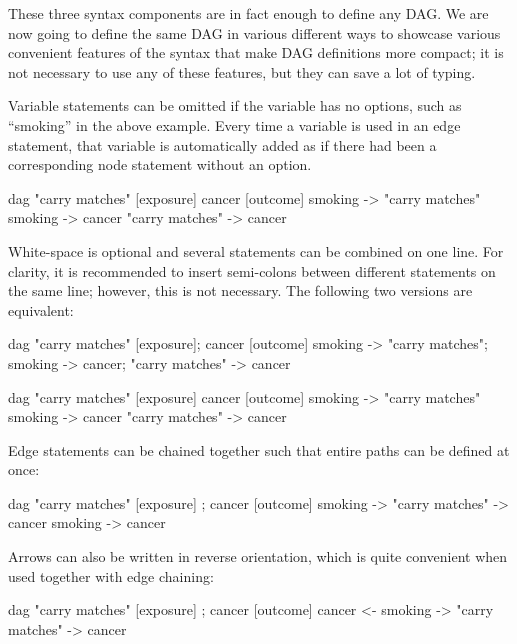 \documentclass[a4paper]{article} %
\begin{document}
These three syntax components are in fact enough to define any DAG. We are now going to define the same DAG in various different ways to showcase various convenient features of the syntax that make DAG definitions more compact; it is not necessary to use any of these features, but they can save a lot of typing.

Variable statements can be omitted if the variable has no options, such as ``smoking'' in the above example. Every time a variable is used in an edge statement, that variable is automatically added as if there had been a corresponding node statement without an option.

\begin{dagcode}
dag{ 
  "carry matches" [exposure]
  cancer [outcome]
  smoking -> "carry matches"
  smoking -> cancer
  "carry matches" -> cancer
}
\end{dagcode}


White-space is optional and several statements can be combined on one line. For clarity, it is recommended to insert semi-colons between different statements on the same line; however, this is not necessary. The following two versions are equivalent:

\begin{dagcode}
dag{ 
  "carry matches" [exposure]; cancer [outcome]
  smoking -> "carry matches"; smoking -> cancer;
  "carry matches" -> cancer
}
\end{dagcode}

\begin{dagcode}
dag{ 
  "carry matches" [exposure] cancer [outcome]
  smoking -> "carry matches" smoking -> cancer
  "carry matches" -> cancer
}
\end{dagcode}


Edge statements can be chained together such that entire paths can be defined at once:

\begin{dagcode}
dag{ 
  "carry matches" [exposure] ; cancer [outcome]
  smoking -> "carry matches" -> cancer 
  smoking -> cancer
}
\end{dagcode}

Arrows can also be written in reverse orientation, which is quite convenient when used together with edge chaining:

\begin{dagcode}
dag{ 
  "carry matches" [exposure] ; cancer [outcome]
  cancer <- smoking -> "carry matches" -> cancer 
}
\end{dagcode}
\end{document}
